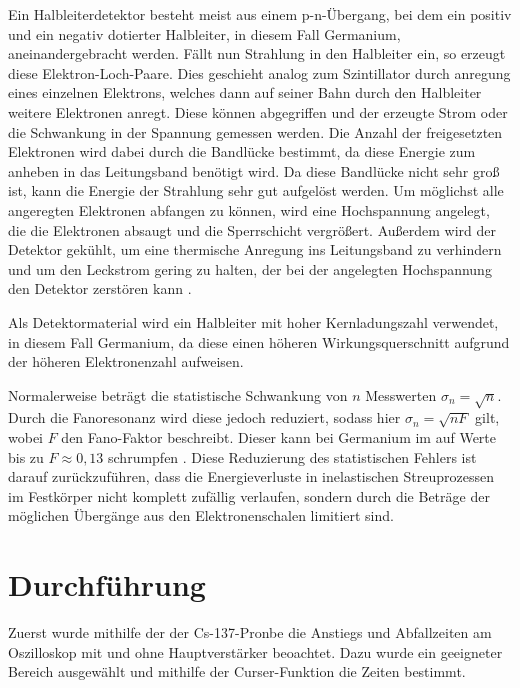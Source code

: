 \documentclass[
	parskip=half,10pt,
	numbers= noenddot, %
	toc=flat, %
	oneside,
	twocolumn,
	]{scrartcl}
\begin{document}
Ein Halbleiterdetektor besteht meist aus einem p-n-Übergang, bei dem ein positiv und ein negativ dotierter Halbleiter, in diesem Fall Germanium, aneinandergebracht werden. 
Fällt nun Strahlung in den Halbleiter ein, so erzeugt diese Elektron-Loch-Paare. Dies geschieht analog zum Szintillator durch anregung eines einzelnen Elektrons, 
welches dann auf seiner Bahn durch den Halbleiter weitere Elektronen anregt. Diese können abgegriffen und der erzeugte Strom oder die Schwankung in der Spannung gemessen 
werden. Die Anzahl der freigesetzten Elektronen wird dabei durch die Bandlücke bestimmt, da diese Energie zum anheben in das Leitungsband benötigt wird. Da diese 
Bandlücke nicht sehr groß ist, kann die Energie der Strahlung sehr gut aufgelöst werden. Um möglichst alle angeregten 
Elektronen abfangen zu können, wird eine Hochspannung angelegt, die die Elektronen absaugt und die Sperrschicht vergrößert. Außerdem wird der Detektor gekühlt, um 
eine thermische Anregung ins Leitungsband zu verhindern und um den Leckstrom gering zu halten, der bei der angelegten Hochspannung den Detektor zerstören kann 
\cite{nicoletti}. 

Als Detektormaterial wird ein Halbleiter mit hoher Kernladungszahl verwendet, in diesem Fall Germanium, da diese einen höheren Wirkungsquerschnitt aufgrund der höheren 
Elektronenzahl aufweisen.

Normalerweise beträgt die statistische Schwankung von $n$ Messwerten $\sigma_n = \sqrt{n}$. Durch die Fanoresonanz wird diese jedoch reduziert, sodass hier 
$\sigma_n = \sqrt{n F}$ gilt, wobei $F$ den Fano-Faktor beschreibt. Dieser kann bei Germanium im auf Werte bis zu $F \approx 0,13$ schrumpfen \cite{fano}. 
Diese Reduzierung des statistischen Fehlers ist darauf zurückzuführen, dass die Energieverluste in inelastischen Streuprozessen im Festkörper nicht komplett zufällig 
verlaufen, sondern durch die Beträge der möglichen Übergänge aus den Elektronenschalen limitiert sind.

\section{Durchführung}


Zuerst wurde mithilfe der der Cs-137-Pronbe die Anstiegs und Abfallzeiten am Oszilloskop mit und ohne Hauptverstärker beoachtet. 
Dazu wurde ein geeigneter Bereich ausgewählt und mithilfe der Curser-Funktion die Zeiten bestimmt. 
\end{document}
